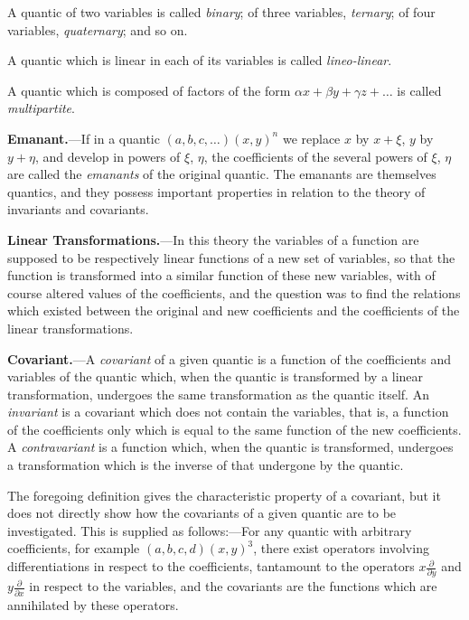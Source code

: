 \documentclass[12pt,a4paper]{article}
\theoremstyle{definition}
\begin{document}
A quantic of two variables is called \textit{binary}; of three variables, \textit{ternary}; of four variables, \textit{quaternary}; and so on.

A quantic which is linear in each of its variables is called \textit{lineo-linear}.

A quantic which is composed of factors of the form $\alpha x + \beta y + \gamma z + \ldots$ is called \textit{multipartite}.

\vspace{1em}

\noindent\textbf{Emanant.}---If in a quantic $(a, b, c, \ldots)(x, y)^n$ we replace $x$ by $x + \xi$, $y$ by $y + \eta$, and develop in powers of $\xi$, $\eta$, the coefficients of the several powers of $\xi$, $\eta$ are called the \textit{emanants} of the original quantic. The emanants are themselves quantics, and they possess important properties in relation to the theory of invariants and covariants.

\vspace{1em}

\noindent\textbf{Linear Transformations.}---In this theory the variables of a function are supposed to be respectively linear functions of a new set of variables, so that the function is transformed into a similar function of these new variables, with of course altered values of the coefficients, and the question was to find the relations which existed between the original and new coefficients and the coefficients of the linear transformations.

\vspace{1em}

\noindent\textbf{Covariant.}---A \textit{covariant} of a given quantic is a function of the coefficients and variables of the quantic which, when the quantic is transformed by a linear transformation, undergoes the same transformation as the quantic itself. An \textit{invariant} is a covariant which does not contain the variables, that is, a function of the coefficients only which is equal to the same function of the new coefficients. A \textit{contravariant} is a function which, when the quantic is transformed, undergoes a transformation which is the inverse of that undergone by the quantic.

The foregoing definition gives the characteristic property of a covariant, but it does not directly show how the covariants of a given quantic are to be investigated. This is supplied as follows:---For any quantic with arbitrary coefficients, for example $(a, b, c, d)(x, y)^3$, there exist operators involving differentiations in respect to the coefficients, tantamount to the operators $x\frac{\partial}{\partial y}$ and $y\frac{\partial}{\partial x}$ in respect to the variables, and the covariants are the functions which are annihilated by these operators.
\end{document}
